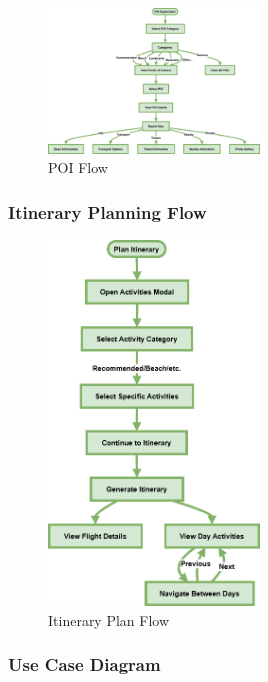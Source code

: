 \documentclass[]{project_final}
\begin{document}
\begin{figure}[ht!]
    \centering
    \includegraphics[width=0.5\textwidth]{TPPOIFlow.png}
    \vspace*{0.0cm}
    \caption{POI Flow}
    \label{fig:1}
\end{figure}
\newpage
\subsubsection{Itinerary Planning Flow}

\begin{figure}[ht!]
    \centering
    \includegraphics[width=0.5\textwidth]{TPItineraryPlanFlow.png}
    \vspace*{0.0cm}
    \caption{Itinerary Plan Flow}
    \label{fig:1}
\end{figure}
\newpage
\subsubsection{Use Case Diagram}
\end{document}
